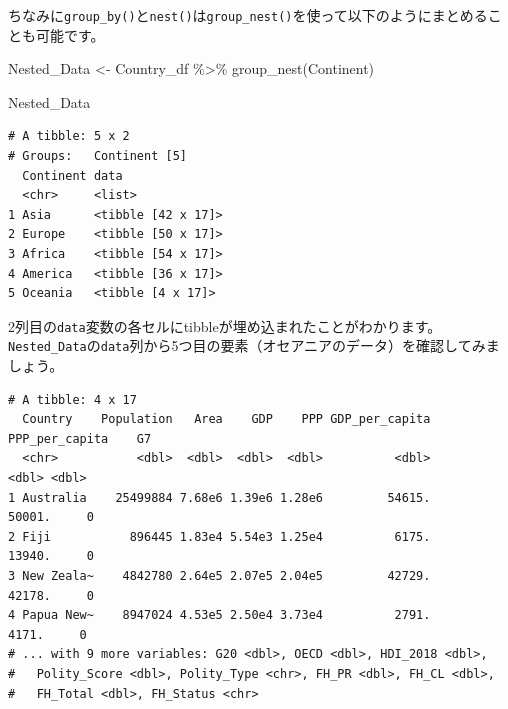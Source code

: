 \documentclass[
  a4paper,
  pandoc,
  ja=standard,
  jafont=haranoaji]{bxjsbook}
\newenvironment{Shaded}{\begin{snugshade}}{\end{snugshade}}
\newcommand{\CommentTok}[1]{\textcolor[rgb]{0.37,0.37,0.37}{#1}}
\newcommand{\DecValTok}[1]{\textcolor[rgb]{0.68,0.00,0.00}{#1}}
\newcommand{\FunctionTok}[1]{\textcolor[rgb]{0.28,0.35,0.67}{#1}}
\newcommand{\NormalTok}[1]{\textcolor[rgb]{0.00,0.48,0.65}{#1}}
\newcommand{\OtherTok}[1]{\textcolor[rgb]{0.00,0.48,0.65}{#1}}
\newcommand{\SpecialCharTok}[1]{\textcolor[rgb]{0.37,0.37,0.37}{#1}}
\begin{document}
ちなみに\texttt{group\_by()}と\texttt{nest()}は\texttt{group\_nest()}を使って以下のようにまとめることも可能です。

\begin{Shaded}
\begin{Highlighting}[numbers=left,,]
\NormalTok{Nested\_Data }\OtherTok{\textless{}{-}}\NormalTok{ Country\_df }\SpecialCharTok{\%\textgreater{}\%} 
  \FunctionTok{group\_nest}\NormalTok{(Continent)}
\end{Highlighting}
\end{Shaded}

\begin{Shaded}
\begin{Highlighting}[numbers=left,,]
\NormalTok{Nested\_Data}
\end{Highlighting}
\end{Shaded}

\begin{verbatim}
# A tibble: 5 x 2
# Groups:   Continent [5]
  Continent data              
  <chr>     <list>            
1 Asia      <tibble [42 x 17]>
2 Europe    <tibble [50 x 17]>
3 Africa    <tibble [54 x 17]>
4 America   <tibble [36 x 17]>
5 Oceania   <tibble [4 x 17]> 
\end{verbatim}

2列目の\texttt{data}変数の各セルにtibbleが埋め込まれたことがわかります。\texttt{Nested\_Data}の\texttt{data}列から5つ目の要素（オセアニアのデータ）を確認してみましょう。

\begin{Shaded}
\end{Shaded}

\begin{verbatim}
# A tibble: 4 x 17
  Country    Population   Area    GDP    PPP GDP_per_capita PPP_per_capita    G7
  <chr>           <dbl>  <dbl>  <dbl>  <dbl>          <dbl>          <dbl> <dbl>
1 Australia    25499884 7.68e6 1.39e6 1.28e6         54615.         50001.     0
2 Fiji           896445 1.83e4 5.54e3 1.25e4          6175.         13940.     0
3 New Zeala~    4842780 2.64e5 2.07e5 2.04e5         42729.         42178.     0
4 Papua New~    8947024 4.53e5 2.50e4 3.73e4          2791.          4171.     0
# ... with 9 more variables: G20 <dbl>, OECD <dbl>, HDI_2018 <dbl>,
#   Polity_Score <dbl>, Polity_Type <chr>, FH_PR <dbl>, FH_CL <dbl>,
#   FH_Total <dbl>, FH_Status <chr>
\end{verbatim}
\end{document}
